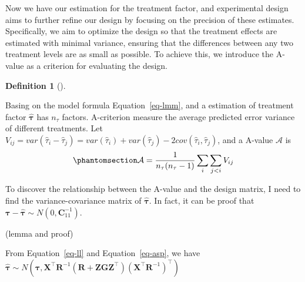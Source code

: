 \documentclass[
  a4paper,
  oneside,
  openany,
  12pt,
  onecolumn]{book}
\theoremstyle{definition}
\newtheorem{definition}{Definition}[chapter]
\theoremstyle{plain}
\theoremstyle{remark}
\begin{document}
Now we have our estimation for the treatment factor, and experimental
design aims to further refine our design by focusing on the precision of
these estimates. Specifically, we aim to optimize the design so that the
treatment effects are estimated with minimal variance, ensuring that the
differences between any two treatment levels are as small as possible.
To achieve this, we introduce the A-value as a criterion for evaluating
the design.

\begin{definition}[]\protect\hypertarget{def-A-value}{}\label{def-A-value}

Basing on the model formula Equation~\ref{eq-lmm}, and a estimation of
treatment factor \(\hat{\boldsymbol{\tau}}\) has \(n_{\tau}\) factors.
A-criterion measure the average predicted error variance of different
treatments. Let
\(V_{ij}= var(\hat{\tau}_i-\hat{\tau}_j)=var(\hat{\tau}_i)+var(\hat{\tau}_j)-2cov(\hat{\tau}_i,\hat{\tau}_j)\),
and a A-value \(\mathcal{A}\) is
\begin{equation}\phantomsection\label{eq-a}{
\mathcal{A}=\frac{1}{n_{\tau}(n_{\tau}-1)}\sum_{i}\sum_{j<i}V_{ij}
}\end{equation}

\end{definition}

To discover the relationship between the A-value and the design matrix,
I need to find the variance-covariance matrix of
\(\hat{\boldsymbol{\tau}}\). In fact, it can be proof that
\(\boldsymbol{\tau}-\hat{\boldsymbol{\tau}}\sim N(0,\boldsymbol{C}_{11}^{-1})\).

(lemma and proof)

From Equation~\ref{eq-ll} and Equation~\ref{eq-asp}, we have
\(\hat{\boldsymbol{\tau}}\sim N(\boldsymbol{\tau},\boldsymbol{X}^\top\boldsymbol{R}^{-1}(\boldsymbol{R}+\boldsymbol{ZGZ}^\top)(\boldsymbol{X}^\top\boldsymbol{R}^{-1})^\top)\)
\end{document}
